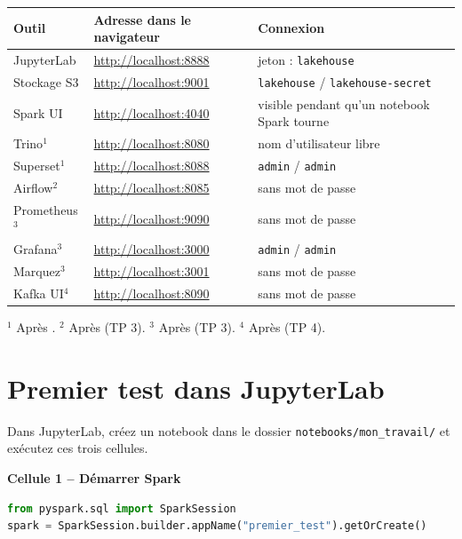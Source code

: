 \begin{center}
\renewcommand{\arraystretch}{1.25}
\begin{tabularx}{\textwidth}{@{}l l X@{}}
\toprule
\textbf{Outil} & \textbf{Adresse dans le navigateur} & \textbf{Connexion} \\
\midrule
JupyterLab        & \url{http://localhost:8888} & jeton : \texttt{lakehouse} \\
Stockage S3       & \url{http://localhost:9001} & \texttt{lakehouse} / \texttt{lakehouse-secret} \\
Spark UI          & \url{http://localhost:4040} & visible pendant qu'un notebook Spark tourne \\
Trino$^{1}$       & \url{http://localhost:8080} & nom d'utilisateur libre \\
Superset$^{1}$     & \url{http://localhost:8088} & \texttt{admin} / \texttt{admin} \\
Airflow$^{2}$    & \url{http://localhost:8085} & sans mot de passe \\
Prometheus$^{3}$ & \url{http://localhost:9090} & sans mot de passe \\
Grafana$^{3}$ & \url{http://localhost:3000} & \texttt{admin} / \texttt{admin} \\
Marquez$^{3}$ & \url{http://localhost:3001} & sans mot de passe \\
Kafka UI$^{4}$ & \url{http://localhost:8090} & sans mot de passe \\
\bottomrule
\end{tabularx}

\smallskip
{\footnotesize $^{1}$ Après . \quad
$^{2}$ Après  (TP 3). \quad
$^{3}$ Après  (TP 3). \quad
$^{4}$ Après  (TP 4).}
\end{center}

\section{Premier test dans JupyterLab}

Dans JupyterLab, créez un notebook dans le dossier \texttt{notebooks/mon\_travail/} et exécutez ces trois cellules.

\textbf{Cellule 1 -- Démarrer Spark}
\begin{lstlisting}[language=Python]
from pyspark.sql import SparkSession
spark = SparkSession.builder.appName("premier_test").getOrCreate()
\end{lstlisting}

